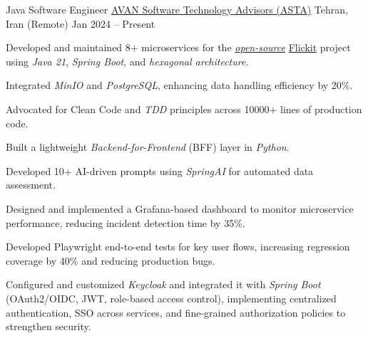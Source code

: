 
\begin{cventries}

  \cventry
    {Java Software Engineer} %
    {\href{https://asta.ir/}{AVAN Software Technology Advisors (ASTA)}} %
    {Tehran, Iran (Remote)} %
    {Jan 2024 -- Present} %
    {
      \begin{cvitems}
        \item Developed and maintained 8+ microservices for the \href{https://github.com/flickit-platform}{\textit{open-source}} \href{https://www.flickit.org}{Flickit} project using \textit{Java 21}, \textit{Spring Boot}, and \textit{hexagonal architecture}.
        \item Integrated \textit{MinIO} and \textit{PostgreSQL}, enhancing data handling efficiency by 20\%.
        \item Advocated for Clean Code and \textit{TDD} principles across 10000+ lines of production code.
        \item Built a lightweight \textit{Backend-for-Frontend} (BFF) layer in \textit{Python}.
        \item Developed 10+ AI-driven prompts using \textit{SpringAI} for automated data assessment.
        \item Designed and implemented a Grafana-based dashboard to monitor microservice performance, reducing incident detection time by 35\%.
        \item Developed Playwright end-to-end tests for key user flows, increasing regression coverage by 40\% and reducing production bugs.
        \item Configured and customized \textit{Keycloak} and integrated it with \textit{Spring Boot} (OAuth2/OIDC, JWT, role-based access control), implementing centralized authentication, SSO across services, and fine-grained authorization policies to strengthen security.
      \end{cvitems}
    }


\end{cventries}
